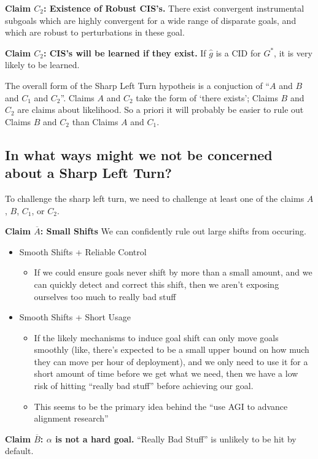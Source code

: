 \documentclass{article}
\begin{document}
\textbf{Claim $C_2$: Existence of Robust CIS's.} There exist convergent instrumental subgoals which are highly convergent for a wide range of disparate goals, and which are robust to perturbations in these goal.

\textbf{Claim $C_2$: CIS's will be learned if they exist.} If $\hat{g}$ is a CID for $G^*$, it is very likely to be learned.

The overall form of the Sharp Left Turn hypotheis is a conjuction of ``$A$ and $B$ and $C_1$ and $C_2$''. Claims $A$ and $C_2$ take the form of `there exists'; Claims $B$ and $C_2$ are claims about likelihood. So a priori it will probably be easier to rule out Claims $B$ and $C_2$ than Claims $A$ and $C_1$.

\subsection{In what ways might we not be concerned about a Sharp Left Turn?}
To challenge the sharp left turn, we need to challenge at least one of the claims $A$, $B$, $C_1$, or $C_2$. 

\textbf{Claim $\overline{A}$: Small Shifts} We can confidently rule out large shifts from occuring.
\begin{itemize}
    \item Smooth Shifts + Reliable Control
    \begin{itemize}
        \item If we could ensure goals never shift by more than a small amount, and we can quickly detect and correct this shift, then we aren’t exposing ourselves too much to really bad stuff
    \end{itemize}
    \item Smooth Shifts + Short Usage
    \begin{itemize}
        \item If the likely mechanisms to induce goal shift can only move goals smoothly (like, there’s expected to be a small upper bound on how much they can move per hour of deployment), and we only need to use it for a short amount of time before we get what we need, then we have a low risk of hitting “really bad stuff” before achieving our goal.
        \item This seems to be the primary idea behind the “use AGI to advance alignment research”
    \end{itemize}
\end{itemize}

\textbf{Claim $\overline{B}$: $\alpha$ is not a hard goal.} “Really Bad Stuff” is unlikely to be hit by default.
\end{document}
